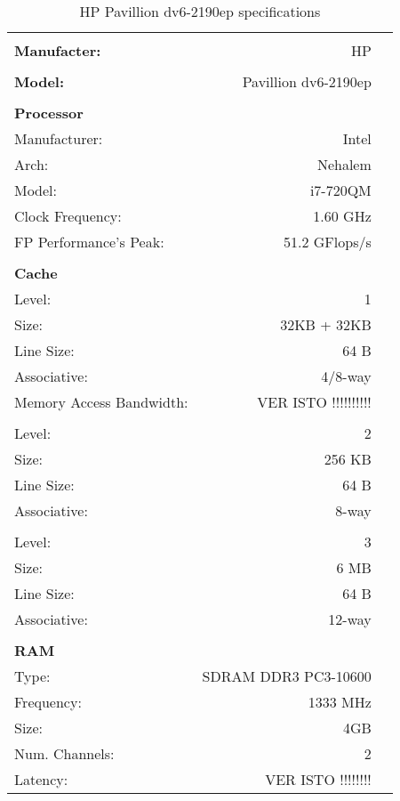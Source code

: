 \documentclass[a4paper,10pt,openright,openbib]{article}
\begin{document}
\begin{table}[!htp]
		\begin{tabular}{lrl}
			\hline \\
			\textbf{Manufacter:} & HP \\
			\hline \\
			\textbf{Model:} & Pavillion dv6-2190ep \\
			\hline \\
			\textbf{Processor} & & \\
			Manufacturer: & Intel & \\
			Arch: & Nehalem & \\
			Model: & i7-720QM & \\
			Clock Frequency: & 1.60 GHz & \\
			FP Performance's Peak: & 51.2 GFlops/s & \\
			\hline \\
			\textbf{Cache} & & \\
			Level: & 1 & \\
			Size: & 32KB + 32KB & \\
			Line Size: & 64 B & \\
			Associative: & 4/8-way & \\
			Memory Access Bandwidth: & VER ISTO !!!!!!!!!! & \\
			\\
			Level: & 2 & \\
			Size: & 256 KB & \\
			Line Size: & 64 B & \\
			Associative: & 8-way & \\
			\\
			Level: & 3 & \\
			Size: & 6 MB & \\
			Line Size: & 64 B & \\
			Associative: & 12-way & \\
			\hline \\
			\textbf{RAM} \\
			Type: & SDRAM DDR3 PC3-10600 & \\
			Frequency: & 1333 MHz & \\
			Size: & 4GB & \\
			Num. Channels: & 2 & \\
			Latency: & VER ISTO !!!!!!!! & \\
		\end{tabular}
		\caption{HP Pavillion dv6-2190ep specifications}
		\label{tab:hp}
\end{table}
\end{document}
